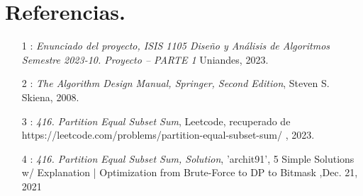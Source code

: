 \documentclass[a4paper]{article}
\begin{document}
\section{Referencias.}
\begin{itemize}
    \item [1]: \textit{Enunciado del proyecto, ISIS 1105 Diseño y Análisis de Algoritmos
    Semestre 2023-10. Proyecto – PARTE 1} Uniandes, 2023.
    \item [2]: \textit{The Algorithm Design Manual, Springer, Second Edition}, Steven S. Skiena, 2008.
    \item [3]: \textit{416. Partition Equal Subset Sum}, Leetcode, recuperado de 
    https://leetcode.com/problems/partition-equal-subset-sum/ , 2023.
    \item [4]: \textit{416. Partition Equal Subset Sum, Solution}, 'archit91', 5 Simple Solutions w/ Explanation 
    | Optimization from Brute-Force to DP to Bitmask ,Dec. 21, 2021
\end{itemize}
\end{document}
